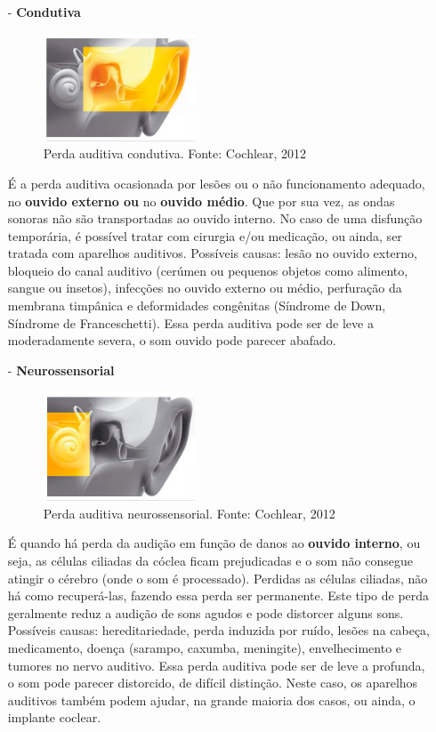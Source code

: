 \documentclass[brasil]{abnt}
\begin{document}
				 \begin{itemize}		
					\item [-] \textbf{Condutiva} 
						\begin{figure}[!htb]
							\center
							\includegraphics[width=45mm]{pac.png}
							\caption{Perda auditiva condutiva. Fonte: Cochlear, 2012}
						\end{figure}
						
						É a perda auditiva ocasionada por lesões ou o não funcionamento adequado, no \textbf{ouvido externo ou} no \textbf{ouvido médio}. Que por sua vez, as ondas sonoras não são transportadas ao ouvido interno. 
						No caso de uma disfunção temporária, é possível tratar com cirurgia e/ou medicação, ou ainda, ser tratada com aparelhos auditivos. Possíveis causas: lesão no ouvido externo, bloqueio do canal 
						auditivo (cerúmen ou pequenos objetos como alimento, sangue ou insetos), infecções no ouvido externo ou médio, perfuração da membrana timpânica e deformidades congênitas (Síndrome de Down, 
						Síndrome de Franceschetti). Essa perda auditiva pode ser de leve a moderadamente severa, o som ouvido pode parecer abafado. 

					\item [-] \textbf{Neurossensorial} 
						\begin{figure}[!htb]
							\center
							\includegraphics[width=45mm]{pan.png}
							\caption{Perda auditiva neurossensorial. Fonte: Cochlear, 2012}
						\end{figure}
						
						É quando há perda da audição em função de danos ao \textbf{ouvido interno}, ou seja, as células ciliadas da cóclea ficam prejudicadas e o som não consegue atingir o cérebro (onde o som é processado). 
						Perdidas as células ciliadas, não há como recuperá-las,	fazendo essa perda ser permanente. Este tipo de perda geralmente reduz a audição de sons agudos e pode distorcer alguns sons. Possíveis causas:
						hereditariedade, perda induzida por ruído, lesões na cabeça, medicamento, doença (sarampo, caxumba, meningite), envelhecimento e tumores no nervo auditivo. Essa perda auditiva pode ser de leve a profunda,
						o som pode parecer distorcido, de difícil distinção. Neste caso, os aparelhos auditivos também podem ajudar, na grande maioria dos casos, ou ainda, o implante coclear. 
					

\end{itemize}
\end{document}
